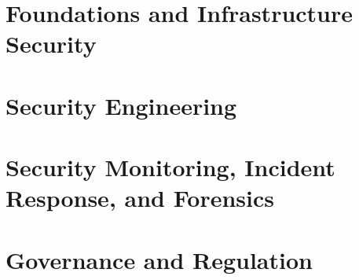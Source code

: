 \documentclass[a4paper,11pt]{report}
\begin{document}
\onehalfspacing
{}
\maketitle

\tableofcontents
\clearpage
{}

\part{Foundations and Infrastructure Security}




\part{Security Engineering}






\part{Security Monitoring, Incident Response, and Forensics}





\part{Governance and Regulation}


\printbibliography[heading=bibintoc]
\end{document}
